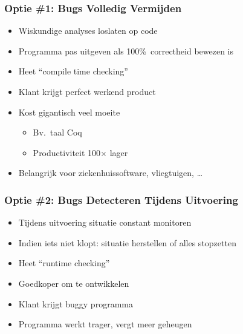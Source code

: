 \begin{frame}
  \frametitle{Optie \#1: Bugs Volledig Vermijden}
  \begin{itemize}
    \item Wiskundige analyses loslaten op code
    \item Programma pas uitgeven als 100\%\ correctheid bewezen is
    \item Heet ``compile time checking''
  \end{itemize}
  \vskip4mm
  \begin{itemize}
    \item[\pro] Klant krijgt perfect werkend product
    \item[\con] Kost gigantisch veel moeite
          \begin{itemize}
            \item Bv.~taal Coq
            \item Productiviteit 100$\times$ lager
          \end{itemize}
  \end{itemize}
  \vskip4mm
  \begin{itemize}
    \item Belangrijk voor ziekenhuissoftware, vliegtuigen, \dots
  \end{itemize}
\end{frame}

\begin{frame}
  \frametitle{Optie \#2: Bugs Detecteren Tijdens Uitvoering}
  \begin{itemize}
    \item Tijdens uitvoering situatie constant monitoren
    \item Indien iets niet klopt: situatie herstellen of alles stopzetten
    \item Heet ``runtime checking''
  \end{itemize}
  \vskip4mm
  \begin{itemize}
    \item[\pro] Goedkoper om te ontwikkelen
    \item[\con] Klant krijgt buggy programma
    \item[\con] Programma werkt trager, vergt meer geheugen
  \end{itemize}
\end{frame}

